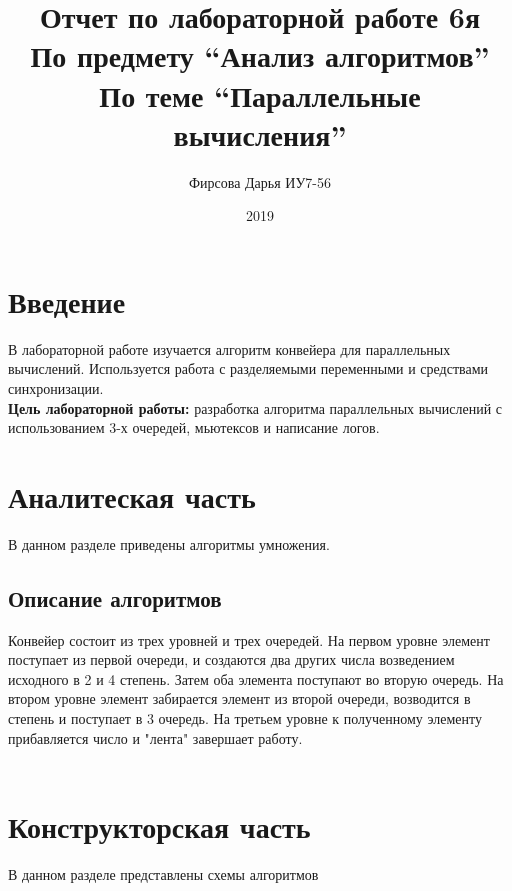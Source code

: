 \documentclass[12pt]{article}
\title{Отчет по лабораторной работе 6я \\ 
	По предмету “Анализ алгоритмов” \\
	По теме “Параллельные вычисления”
}
\date{2019}
\author{Фирсова Дарья ИУ7-56}
\begin{document}
  
	\maketitle  
	\newpage
	\section*{Введение}
	В лабораторной работе изучается алгоритм конвейера для параллельных вычислений. Используется работа с разделяемыми переменными и средствами синхронизации.  \\
	\textbf{Цель лабораторной работы:} разработка алгоритма параллельных вычислений с использованием 3-х очередей, мьютексов и написание логов.  \\
\newpage

\section{Аналитеская часть}
В данном разделе приведены алгоритмы умножения.
\subsection{Описание алгоритмов}
Конвейер состоит из трех уровней и трех очередей. На первом уровне элемент поступает из первой очереди, и создаются два других числа возведением исходного в 2 и 4 степень. Затем оба элемента поступают во вторую очередь. На втором уровне элемент забирается элемент из второй очереди, возводится в степень и поступает в 3 очередь. На третьем уровне к полученному элементу прибавляется число и "лента" завершает работу.\\

	
\\

\newpage
\section{Конструкторская часть}
В данном разделе представлены схемы алгоритмов 
\end{document}
